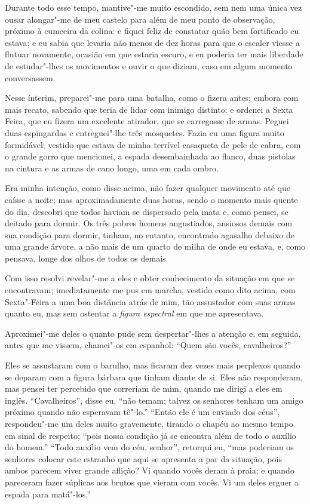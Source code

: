 Durante todo esse tempo, mantive"-me muito escondido, sem nem uma única
vez ousar alongar"-me de meu castelo para além de meu ponto de
observação, próximo à cumeeira da colina: e fiquei feliz de constatar
quão bem fortificado eu estava; e eu sabia que levaria não menos de dez
horas para que o escaler viesse a flutuar novamente, ocasião em que
estaria escuro, e eu poderia ter mais liberdade de estudar"-lhes os
movimentos e ouvir o que diziam, caso em algum momento conversassem.

Nesse ínterim, preparei"-me para uma batalha, como o fizera antes; embora
com mais recato, sabendo que teria de lidar com inimigo distinto; e
ordenei a Sexta Feira, que eu fizera um excelente atirador, que se
carregasse de armas. Peguei duas espingardas e entreguei"-lhe três
mosquetes. Fazia eu uma figura muito formidável; vestido que estava de
minha terrível casaqueta de pele de cabra, com o grande gorro que
mencionei, a espada desembainhada ao flanco, duas pistolas na cintura e
as armas de cano longo, uma em cada ombro.

Era minha intenção, como disse acima, não fazer qualquer movimento até
que caísse a noite; mas aproximadamente duas horas, sendo o momento mais
quente do dia, descobri que todos haviam se dispersado pela mata e, como
pensei, se deitado para dormir. Os três pobres homens angustiados,
ansiosos demais com sua condição para dormir, tinham, no entanto,
encontrado agasalho debaixo de uma grande árvore, a não mais de um
quarto de milha de onde eu estava, e, como pensava, longe dos olhos de
todos os demais.

Com isso resolvi revelar"-me a eles e obter conhecimento da situação em
que se encontravam; imediatamente me pus em marcha, vestido como dito
acima, com Sexta"-Feira a uma boa distância atrás de mim, tão assustador
com suas armas quanto eu, mas sem ostentar a \emph{figura espectral} em
que me apresentava.

Aproximei"-me deles o quanto pude sem despertar"-lhes a atenção e, em
seguida, antes que me vissem, chamei"-os em espanhol: ``Quem são vocês,
cavalheiros?''

Eles se assustaram com o barulho, mas ficaram dez vezes mais perplexos
quando se deparam com a figura bárbara que tinham diante de si. Eles não
responderam, mas pensei ter percebido que correriam de mim, quando me
dirigi a eles em inglês. ``Cavalheiros'', disse eu, ``não temam; talvez
os senhores tenham um amigo próximo quando não esperavam tê"-lo.''
``Então ele é um enviado dos céus'', respondeu"-me um deles muito
gravemente, tirando o chapéu ao mesmo tempo em sinal de respeito; ``pois
nossa condição já se encontra além de todo o auxílio do homem.'' ``Todo
auxílio vem do céu, senhor'', retorqui eu, ``mas poderiam os senhores
colocar este estranho que aqui se apresenta a par da situação, pois
ambos parecem viver grande aflição? Vi quando vocês deram à praia; e
quando pareceram fazer súplicas aos brutos que vieram com vocês. Vi um
deles erguer a espada para matá"-los.''

